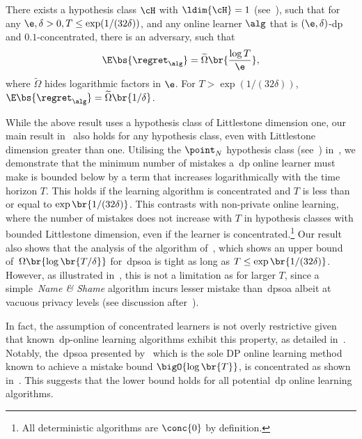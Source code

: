 \begin{corollary}\label{thm:informal-small}
     There exists a hypothesis class \(\cH\) with \(\ldim{\cH}=1\) (see~), such that for any \(\e, \delta > 0, T \leq \exp(1/(32\delta))\), and any online learner \(\alg\) that is \((\e, \delta)\)-\Gls{dp} and \(0.1\)-concentrated, there is an adversary, such that 
    \begin{equation}
        \E\bs{\regret_{\alg}} =\widetilde\Omega\br{\frac{\log T}{\e}},
        \end{equation}
    where \(\widetilde \Omega\) hides logarithmic factors in \(\e\). For \(T > \exp(1/(32\delta))\), \(\E\bs{\regret_{\alg}} = \widetilde\Omega\br{1 / \delta}\).
\end{corollary}

 While the above result uses a hypothesis class of Littlestone dimension one, our main result in~ also holds for any hypothesis class, even with Littlestone dimension greater than one. Utilising the \(\point_N\) hypothesis class (see~) in~, we demonstrate that the minimum number of mistakes a~\Gls{dp} online learner must make is bounded below by a term that increases logarithmically with the time horizon \(T\). 
 This holds if the learning algorithm is concentrated and \(T\) is less than or equal to \(\exp\br{1 / (32\delta)}\). This contrasts with non-private online learning, where the number of mistakes does not increase with \(T\) in hypothesis classes with bounded Littlestone dimension, even if the learner is concentrated.\footnote{All deterministic algorithms are \(\conc{0}\) by definition.} Our result also shows that the analysis of the algorithm of~\citet{golowich2021littlestone}, which shows an upper bound of~\(\Omega\br{\log \br{T/\delta}}\) for~\Gls{dpsoa} is tight as long as \(T\leq\exp\br{1 / (32\delta)}\). However, as illustrated in~, this is not a limitation as for larger \(T\), since a simple~\emph{Name \& Shame} algorithm incurs lesser mistake than~\Gls{dpsoa} albeit at vacuous privacy levels (see discussion after~). 


In fact, the assumption of concentrated learners is not overly restrictive given that known~\Gls{dp}-online learning algorithms exhibit this property, as detailed in~. Notably, the~\Gls{dpsoa} presented by~\citet{golowich2021littlestone} which is the sole DP online learning method known to achieve a mistake bound \(\bigO{\log\br{T}}\), is concentrated as shown in~. This suggests that the lower bound holds for all potential~\Gls{dp} online learning algorithms.


